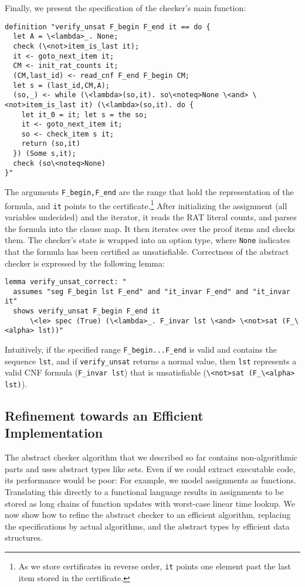 \documentclass{llncs}
\newcommand{\isai}{\lstinline[language=isabelle,basicstyle=\normalsize\ttfamily\slshape]}
\begin{document}
Finally, we present the specification of the checker's main function:
\begin{lstlisting}
definition "verify_unsat F_begin F_end it == do {
  let A = \<lambda>_. None;
  check (\<not>item_is_last it);
  it <- goto_next_item it;
  CM <- init_rat_counts it;
  (CM,last_id) <- read_cnf F_end F_begin CM;
  let s = (last_id,CM,A);
  (so,_) <- while (\<lambda>(so,it). so\<noteq>None \<and> \<not>item_is_last it) (\<lambda>(so,it). do {
    let it_0 = it; let s = the so;
    it <- goto_next_item it;
    so <- check_item s it;
    return (so,it)
  }) (Some s,it);
  check (so\<noteq>None)
}"
\end{lstlisting}
The arguments \isai{F_begin,F_end} are the range that hold the representation of the formula, and \isai{it} points to the 
certificate.\footnote{As we store certificates in reverse order, \isai{it} points one element past the last item stored in the certificate.}
After initializing the assignment (all variables undecided) and the iterator, it reads the RAT literal counts,
and parses the formula into the clause map. It then iterates over the proof items and checks them. 
The checker's state is wrapped into an option type, where \isai{None} indicates that the formula has been certified as unsatisfiable.
%
Correctness of the abstract checker is expressed by the following lemma:
\begin{lstlisting}
lemma verify_unsat_correct: "
  assumes "seg F_begin lst F_end" and "it_invar F_end" and "it_invar it" 
  shows verify_unsat F_begin F_end it 
      \<le> spec (True) (\<lambda>_. F_invar lst \<and> \<not>sat (F_\<alpha> lst))"
\end{lstlisting}
Intuitively, if the specified range \isai{F_begin...F_end} is valid and contains the sequence \isai{lst},
and if \isai{verify_unsat} returns a normal value, then \isai{lst} represents a valid CNF formula (\isai{F_invar lst}) 
that is unsatisfiable (\isai{\<not>sat (F_\<alpha> lst)}).

\subsection{Refinement towards an Efficient Implementation}    
The abstract checker algorithm that we described so far contains non-algorithmic parts and uses abstract types like sets.
Even if we could extract executable code, its performance would be poor: For example, we model assignments as functions. Translating 
this directly to a functional language results in assignments to be stored as long chains of function updates with worst-case linear time lookup.
We now show how to refine the abstract checker to an efficient algorithm, replacing the specifications by actual algorithms,
and the abstract types by efficient data structures.
\end{document}
